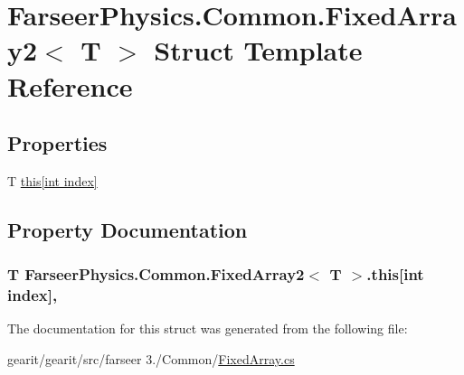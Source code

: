 \hypertarget{struct_farseer_physics_1_1_common_1_1_fixed_array2_3_01_t_01_4}{\section{Farseer\+Physics.\+Common.\+Fixed\+Array2$<$ T $>$ Struct Template Reference}
\label{struct_farseer_physics_1_1_common_1_1_fixed_array2_3_01_t_01_4}
}
\subsection*{Properties}
\begin{DoxyCompactItemize}
\item 
T \hyperlink{struct_farseer_physics_1_1_common_1_1_fixed_array2_3_01_t_01_4_af319bb891b4d82d6e30f0ad222b1d879}{this\mbox{[}int index\mbox{]}}
\end{DoxyCompactItemize}


\subsection{Property Documentation}
\hypertarget{struct_farseer_physics_1_1_common_1_1_fixed_array2_3_01_t_01_4_af319bb891b4d82d6e30f0ad222b1d879}{
\subsubsection[{this[int index]}]{\setlength{\rightskip}{0pt plus 5cm}T Farseer\+Physics.\+Common.\+Fixed\+Array2$<$ T $>$.this\mbox{[}int index\mbox{]}\hspace{0.3cm}{\ttfamily [get]}, {\ttfamily [set]}}}\label{struct_farseer_physics_1_1_common_1_1_fixed_array2_3_01_t_01_4_af319bb891b4d82d6e30f0ad222b1d879}


The documentation for this struct was generated from the following file\+:\begin{DoxyCompactItemize}
\item 
gearit/gearit/src/farseer 3./\+Common/\hyperlink{_fixed_array_8cs}{Fixed\+Array.\+cs}\end{DoxyCompactItemize}
